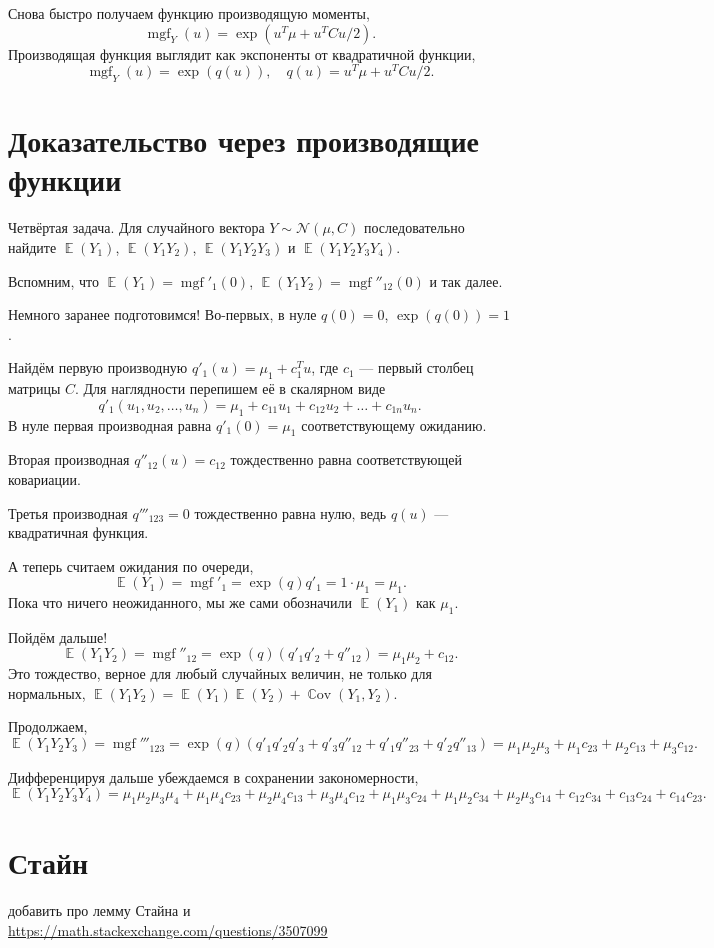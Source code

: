 \documentclass[12pt]{article}
\DeclareMathOperator{\Cov}{\mathbb{C}ov}
\DeclareMathOperator{\E}{\mathbb{E}}
\DeclareMathOperator{\mgf}{mgf}
\newcommand{\cN}{\mathcal{N}}
\begin{document}
Снова быстро получаем функцию производящую моменты, 
\[
\mgf_Y(u) = \exp(u^T\mu + u^T C u/2).
\]
Производящая функция выглядит как экспоненты от квадратичной функции,
\[
\mgf_Y(u) = \exp(q(u)), \quad q(u) = u^T\mu + u^T C u/2.
\]

\section*{Доказательство через производящие функции}
Четвёртая задача. 
Для случайного вектора $Y \sim \cN(\mu, C)$ последовательно найдите $\E(Y_1)$, $\E(Y_1 Y_2)$, $\E(Y_1 Y_2 Y_3)$ и $\E(Y_1 Y_2 Y_3 Y_4)$.

Вспомним, что $\E(Y_1) = \mgf'_1(0)$, $\E(Y_1 Y_2) = \mgf''_{12}(0)$ и так далее. 

Немного заранее подготовимся! Во-первых, в нуле $q(0) = 0$, $\exp(q(0)) = 1$.

Найдём первую производную $q'_1(u) = \mu_1 + c_1^T u$, где $c_1$ — первый столбец матрицы $C$.
Для наглядности перепишем её в скалярном виде
\[
    q'_1(u_1, u_2, \dots, u_n) = \mu_1 + c_{11}u_1 + c_{12}u_2 + \dots + c_{1n}u_n.
\]
В нуле первая производная равна $q'_1(0) = \mu_1$ соответствующему ожиданию. 

Вторая производная $q''_{12}(u) = c_{12}$ тождественно равна соответствующей ковариации. 

Третья производная $q'''_{123} = 0$  тождественно равна нулю, ведь $q(u)$ — квадратичная функция.

А теперь считаем ожидания по очереди,
\[
    \E(Y_1) = \mgf'_1 = \exp(q) q'_1 = 1 \cdot \mu_1 = \mu_1.
\]
Пока что ничего неожиданного, мы же сами обозначили $\E(Y_1)$ как $\mu_1$.

Пойдём дальше!
\[
    \E(Y_1Y_2) = \mgf''_{12} = \exp(q) (q'_1q'_2 + q''_{12}) = \mu_1 \mu_2 + c_{12}.
\]
Это тождество, верное для любый случайных величин, не только для нормальных, $\E(Y_1 Y_2) = \E(Y_1) \E(Y_2) + \Cov(Y_1, Y_2)$.

Продолжаем,
\[
    \E(Y_1 Y_2 Y_3) = \mgf'''_{123} = \exp(q) (q'_1 q'_2 q'_3 + q'_3 q''_{12} + q'_1 q''_{23} + q'_2 q''_{13}) = \mu_1 \mu_2\mu_3 + \mu_1 c_{23} + \mu_2 c_{13} + \mu_3 c_{12}.
\]

Дифференцируя дальше убеждаемся в сохранении закономерности, 
\[
    \E(Y_1 Y_2 Y_3 Y_4) = \mu_1 \mu_2\mu_3 \mu_4 + \mu_1 \mu_4 c_{23} + \mu_2 \mu_4 c_{13} + \mu_3 \mu_4 c_{12} + \mu_1 \mu_3 c_{24} + \mu_1 \mu_2 c_{34} + \mu_2 \mu_3 c_{14} +  c_{12}c_{34} + c_{13}c_{24} + c_{14}c_{23}.
\]


\section*{Стайн}

добавить про лемму Стайна и \url{https://math.stackexchange.com/questions/3507099}
\end{document}
